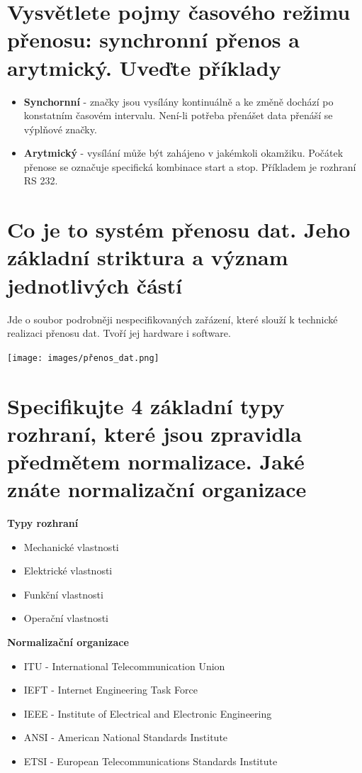 \section{Vysvětlete pojmy časového režimu přenosu: synchronní přenos a arytmický. Uveďte příklady}
\begin{itemize}
    \item  \textbf{ Synchornní} - značky jsou vysílány kontinuálně a ke změně dochází po konstatním časovém intervalu.
    Není-li potřeba přenášet data přenáší se výplňové značky.
    \item \textbf{Arytmický} - vysílání může být zahájeno v jakémkoli okamžiku. 
    Počátek přenose se označuje specifická kombinace start a stop. Příkladem je rozhraní RS 232.
    
\end{itemize}

\section{Co je to systém přenosu dat. Jeho základní striktura a význam jednotlivých částí}
Jde o soubor podrobněji nespecifikovaných zařázení, které slouží k technické realizaci přenosu dat.
Tvoří jej hardware i software.

\texttt{[image: images/přenos\_dat.png]}

\section{Specifikujte  4 základní typy rozhraní, které jsou zpravidla předmětem normalizace. Jaké znáte normalizační organizace}
\textbf{Typy rozhraní}
\begin{itemize}
    \item Mechanické vlastnosti
    \item Elektrické vlastnosti
    \item Funkční vlastnosti
    \item Operační vlastnosti
\end{itemize}
\textbf{Normalizační organizace}
\begin{itemize}
    \item ITU - International Telecommunication Union
     \item IEFT - Internet Engineering Task Force
     \item IEEE - Institute of Electrical and Electronic Engineering
     \item ANSI - American National Standards Institute
     \item ETSI - European Telecommunications Standards Institute
\end{itemize}

